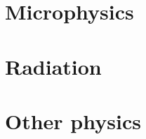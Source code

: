 \documentclass[onecolumn,iop]{emulateapj}  %
\begin{document}
\section{Microphysics}
\label{sec.microphysics}

 

\section{Radiation}
\label{sec.allrad}
 
 
 

\section{Other physics}
\label{sec.otherphys}
 










 

  



  


\end{document}
